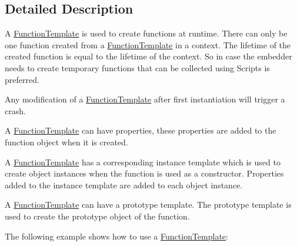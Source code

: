 \subsection{Detailed Description}
A \hyperlink{classv8_1_1FunctionTemplate}{Function\+Template} is used to create functions at runtime. There can only be one function created from a \hyperlink{classv8_1_1FunctionTemplate}{Function\+Template} in a context. The lifetime of the created function is equal to the lifetime of the context. So in case the embedder needs to create temporary functions that can be collected using Scripts is preferred.

Any modification of a \hyperlink{classv8_1_1FunctionTemplate}{Function\+Template} after first instantiation will trigger a crash.

A \hyperlink{classv8_1_1FunctionTemplate}{Function\+Template} can have properties, these properties are added to the function object when it is created.

A \hyperlink{classv8_1_1FunctionTemplate}{Function\+Template} has a corresponding instance template which is used to create object instances when the function is used as a constructor. Properties added to the instance template are added to each object instance.

A \hyperlink{classv8_1_1FunctionTemplate}{Function\+Template} can have a prototype template. The prototype template is used to create the prototype object of the function.

The following example shows how to use a \hyperlink{classv8_1_1FunctionTemplate}{Function\+Template}\+:


